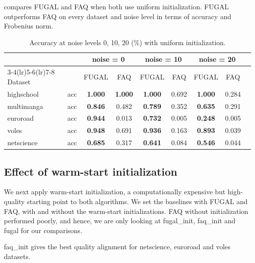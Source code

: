 \documentclass[11pt,a4paper]{article}
\begin{document}
 compares FUGAL and FAQ when both use uniform initialization.  FUGAL outperforms FAQ on every dataset and noise level in terms of accuracy and Frobenius norm.

\begin{table}[H]
  \centering
  \caption{Accuracy at noise levels 0, 10, 20 (\%) with uniform initialization.
           }
  \label{tab:baseline}
  \setlength{\tabcolsep}{5pt}
  \begin{tabular}{llccccccc}
    \toprule
    & & \multicolumn{2}{c}{noise = 0} & \multicolumn{2}{c}{noise = 10} & \multicolumn{2}{c}{noise = 20} \\
    \cmidrule(lr){3-4}\cmidrule(lr){5-6}\cmidrule(lr){7-8}
    Dataset & & FUGAL & FAQ & FUGAL & FAQ & FUGAL & FAQ \\
    \midrule
    highschool  & acc  & \textbf{1.000} & \textbf{1.000} & \textbf{1.000} & 0.692 & \textbf{1.000} & 0.284 \\
    multimanga  & acc  & \textbf{0.846} & 0.482 & \textbf{0.789} & 0.352 & \textbf{0.635} & 0.291 \\
    euroroad    & acc  & \textbf{0.944} & 0.013 & \textbf{0.732} & 0.005 & \textbf{0.248} & 0.005 \\
    voles       & acc  & \textbf{0.948} & 0.691 & \textbf{0.936} & 0.163 & \textbf{0.893} & 0.039 \\
    netscience  & acc  & \textbf{0.685} & 0.317 & \textbf{0.641} & 0.084 & \textbf{0.546} & 0.044 \\
    \bottomrule
  \end{tabular}
\end{table}



\subsection{Effect of warm-start initialization}
\label{sec:init}


We next apply warm-start initialization,  a computationally expensive but high-quality starting point to both algorithms. We set the baselines with FUGAL and FAQ, with and without the warm-start initializations. FAQ without initialization performed poorly, and hence, we are only looking at fugal\_init, faq\_init and fugal for our comparisons.

faq\_init gives the best quality alignment for netscience, euroroad and voles datasets.
\end{document}

